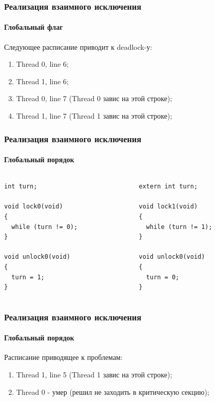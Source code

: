 \begin{frame}
\frametitle{Реализация взаимного исключения}
\framesubtitle{Глобальный флаг}

Следующее расписание приводит к deadlock-у:
\begin{enumerate}
  \item Thread 0, line 6;
  \item Thread 1, line 6;
  \item Thread 0, line 7 (Thread 0 завис на этой строке);
  \item Thread 1, line 7 (Thread 1 завис на этой строке);
\end{enumerate}
\end{frame}

\begin{frame}[fragile]
\frametitle{Реализация взаимного исключения}
\framesubtitle{Глобальный порядок}

\begin{columns}[T]
  \begin{column}{.45\linewidth}
    \begin{lstlisting}
int turn;

void lock0(void)
{
  while (turn != 0);
}

void unlock0(void)
{
  turn = 1;
}
    \end{lstlisting}
  \end{column}
  \begin{column}{.45\linewidth}
    \begin{lstlisting}
extern int turn;

void lock1(void)
{
  while (turn != 1);
}

void unlock0(void)
{
  turn = 0;
}
    \end{lstlisting}
  \end{column}
\end{columns}
\end{frame}

\begin{frame}
\frametitle{Реализация взаимного исключения}
\framesubtitle{Глобальный порядок}

Расписание приводящее к проблемам:
\begin{enumerate}
  \item Thread 1, line 5 (Thread 1 завис на этой строке);
  \item Thread 0 - умер (решил не заходить в критическую секцию);
\end{enumerate}
\end{frame}

